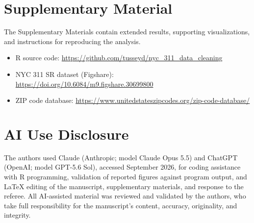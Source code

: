 \documentclass[linenumber]{jdsart}
\begin{document}

\section*{Supplementary Material}
The Supplementary Materials contain extended results, supporting
visualizations, and instructions for reproducing the analysis.

\begin{itemize}[leftmargin=*, nosep]
  \item R source code: \url{https://github.com/tusseyd/nyc_311_data_cleaning}
  \item NYC 311 SR dataset (Figshare): \url{https://doi.org/10.6084/m9.figshare.30699800}
  \item ZIP code database: \url{https://www.unitedstateszipcodes.org/zip-code-database/}
\end{itemize}


\section*{AI Use Disclosure}
The authors used Claude (Anthropic; model Claude Opus 5.5) and 
ChatGPT (OpenAI; model GPT-5.6 Sol), accessed September 2026, 
for coding assistance with R programming, validation of reported 
figures against program output, and \LaTeX{} editing of the 
manuscript, supplementary materials, and response to the 
referee. All AI-assisted material was reviewed and validated by 
the authors, who take full responsibility for the manuscript's 
content, accuracy, originality, and integrity.




\end{document}

